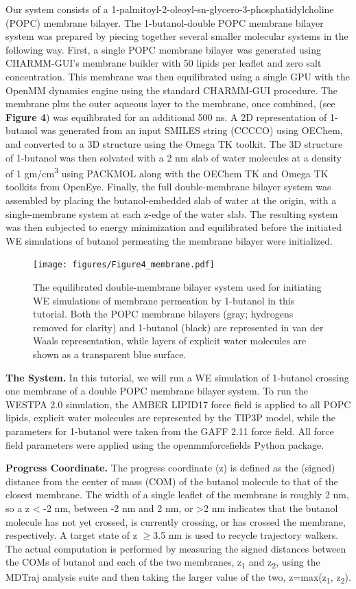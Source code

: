 Our system consists of a 1-palmitoyl-2-oleoyl-sn-glycero-3-phosphatidylcholine (POPC) membrane bilayer. 
The 1-butanol-double POPC membrane bilayer system was prepared by piecing together several smaller molecular systems in the following way.
First, a single POPC membrane bilayer was generated using CHARMM-GUI’s membrane builder with 50 lipids per leaflet and zero salt concentration. 
This membrane was then equilibrated using a single GPU with the OpenMM dynamics engine using the standard CHARMM-GUI procedure. 
The membrane plus the outer aqueous layer to the membrane, once combined, (see \textbf{Figure 4}) was equilibrated for an additional 500 ns.
A 2D representation of 1-butanol was generated from an input SMILES string (CCCCO) using OEChem, and converted to a 3D structure using the Omega TK toolkit. 
The 3D structure of 1-butanol was then solvated with a 2 nm slab of water molecules at a density of 1 gm/cm\textsuperscript{3} using PACKMOL along with the OEChem TK and Omega TK toolkits from OpenEye.
Finally, the full double-membrane bilayer system was assembled by placing the butanol-embedded slab of water at the origin, with a single-membrane system at each z-edge of the water slab. 
The resulting system was then subjected to energy minimization and equilibrated before the initiated WE simulations of butanol permeating the membrane bilayer were initialized. 

\begin{figure}[t]
\centering
\texttt{[image: figures/Figure4\_membrane.pdf]}
\caption{The equilibrated double-membrane bilayer system used for initiating WE simulations of membrane permeation by 1-butanol in this tutorial. 
Both the POPC membrane bilayers (gray; hydrogens removed for clarity) and 1-butanol (black) are represented in van der Waals representation, while layers of explicit water molecules are shown as a transparent blue surface.}
\end{figure}

\textbf{The System.} In this tutorial, we will run a WE simulation of 1-butanol crossing one membrane of a double POPC membrane bilayer system. 
To run the WESTPA 2.0 simulation, the AMBER LIPID17 force field is applied to all POPC lipids, explicit water molecules are represented by the TIP3P model, while the parameters for 1-butanol were taken from the GAFF 2.11 force field. 
All force field parameters were applied using the openmmforcefields Python package.

\textbf{Progress Coordinate.} The progress coordinate (z) is defined as the (signed) distance from the center of mass (COM) of the butanol molecule to that of the closest membrane. 
The width of a single leaflet of the membrane is roughly 2 nm, so a z < -2 nm, between -2 nm and 2 nm, or >2 nm indicates that the butanol molecule has not yet crossed, is currently crossing, or has crossed the membrane, respectively. 
A target state of z $\geq$3.5 nm is used to recycle trajectory walkers. 
The actual computation is performed by measuring the signed distances between the COMs of butanol and each of the two membranes, z\textsubscript{1} and z\textsubscript{2}, using the MDTraj analysis suite and then taking the larger value of the two, z=max(z\textsubscript{1}, z\textsubscript{2}).

